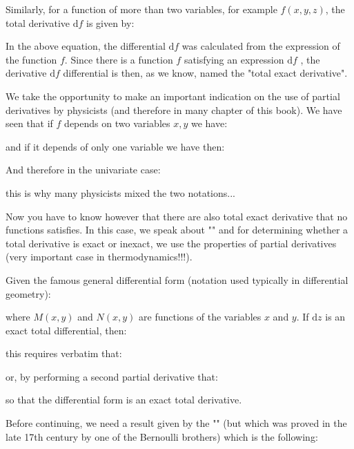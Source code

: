 	\begin{tcolorbox}[title=Remark,colframe=black,arc=10pt]
Similarly, for a function of more than two variables, for example $f(x,y,z)$, the total derivative $\mathrm{d}f$ is given by:
	
	In the above equation, the differential $\mathrm{d}f$  was calculated from the expression of the function $f$. Since there is a function $f$ satisfying an expression $\mathrm{d}f$ , the derivative $\mathrm{d}f$  differential is then, as we know, named the "total exact derivative".
	\end{tcolorbox}	
	
	We take the opportunity to make an important indication on the use of partial derivatives by physicists (and therefore in many chapter of this book). We have seen that if $f$ depends on two variables $x, y$ we have:
	
	and if it depends of only one variable we have then:
	
	And therefore in the univariate case:
	
	this is why many physicists mixed the two notations...
	
	Now you have to know however that there are also total exact derivative that no functions satisfies. In this case, we speak about "\label{total inexact derivative}" and for determining whether a total derivative is exact or inexact, we use the properties of partial derivatives (very important case in thermodynamics!!!).
	
	Given the famous general differential form (notation used typically in differential geometry):
	
	where $M (x, y)$ and $N (x, y)$ are functions of the variables $x$ and $y$. If $\mathrm{d}z$ is an exact total differential, then:
	
	this requires verbatim that:
	
	or, by performing a second partial derivative that:
	
	so that the differential form is an exact total derivative.
	
	Before continuing, we need a result given by the "\label{Schwarz theorem}" (but which was proved in the late 17th century by one of the Bernoulli brothers) which is the following:
	
